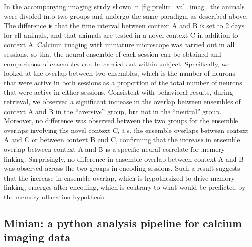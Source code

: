 \documentclass[master.tex]{subfiles}
\begin{document}
In the accompanying imaging study shown in \autoref{fig:prelim_val_imag}, the
animals were divided into two groups and undergo the same paradigm as described
above. The difference is that the time interval between context A and B is set
to 2 days for all animals, and that animals are tested in a novel context C in
addition to context A. Calcium imaging with miniature microscope was carried out in all
sessions, so that the neural ensemble of each session can be obtained and comparisons
of ensembles can be carried out within subject. Specifically, we looked at the
overlap between two ensembles, which is the number of neurons that were active
in both sessions as a proportion of the total number of neurons that were active in
either sessions. Consistent with behavioral results, during retrieval, we observed
a significant increase in the overlap between ensembles of context A and B in
the ``aversive'' group, but not in the ``neutral'' group. Moreover, no
difference was observed between the two groups for the ensemble overlaps
involving the novel context C, \textit{i.e.} the ensemble overlaps between
context A and C or between context B and C, confirming that the increase in
ensemble overlap between context A and B is a specific neural correlate for
memory linking. Surprisingly, no difference in ensemble overlap between context
A and B was observed across the two groups in encoding sessions. Such a result
suggests that the increase in ensemble overlap, which is hypothesized to drive
memory linking, emerges after encoding, which is contrary to what would be
predicted by the memory allocation hypothesis.

\subsection*{Minian: a python analysis pipeline for calcium imaging data}
\end{document}
